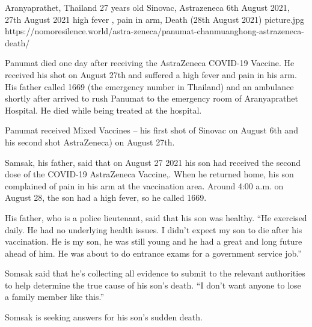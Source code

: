 {Aranyaprathet, Thailand}
{27 years old}
{Sinovac, Astrazeneca}
{6th August 2021, 27th August 2021}
{high fever , pain in arm, Death (28th August 2021)}
{picture.jpg}
{https://nomoresilence.world/astra-zeneca/panumat-chanmuanghong-astrazeneca-death/}
{

Panumat died one day after receiving the AstraZeneca COVID-19 Vaccine. He
received his shot on August 27th and suffered a high fever and pain in his
arm. His father called 1669 (the emergency number in Thailand) and an ambulance
shortly after arrived to rush Panumat to the emergency room of Aranyaprathet
Hospital. He died while being treated at the hospital.

Panumat received Mixed Vaccines – his first shot of Sinovac on August 6th and
his second shot AstraZeneca) on August 27th.

Samsak, his father, said that on August 27 2021 his son had received the second
dose of the COVID-19 AstraZeneca Vaccine,. When he returned home, his son
complained of pain in his arm at the vaccination area. Around 4:00 a.m. on
August 28, the son had a high fever, so he called 1669.

His father, who is a police lieutenant, said that his son was healthy. “He
exercised daily. He had no underlying health issues. I didn’t expect my son to
die after his vaccination. He is my son, he was still young and he had a great
and long future ahead of him. He was about to do entrance exams for a government
service job.”

Somsak said that he’s collecting all evidence to submit to the relevant
authorities to help determine the true cause of his son’s death. “I don’t want
anyone to lose a family member like this.”

Somsak is seeking answers for his son’s sudden death.

}
